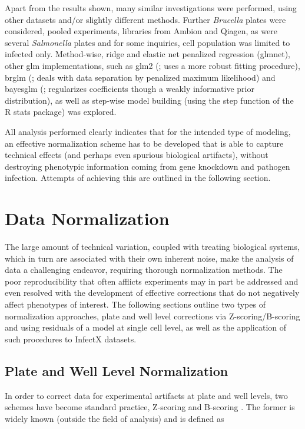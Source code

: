 Apart from the results shown, many similar investigations were performed, using other datasets and\slash or slightly different methods. Further \textit{Brucella} plates were considered, pooled  experiments, libraries from Ambion and Qiagen, as were several \textit{Salmonella} plates and for some inquiries, cell population was limited to infected only. Method-wise, ridge and elastic net penalized regression (glmnet), other glm implementations, such as glm2 (\citet{Marschner2011}; uses a more robust fitting procedure), brglm (\citet{Kosmidis2007}; deals with data separation by penalized maximum likelihood) and bayesglm (\citet{Gelman2007}; regularizes coefficients though a weakly informative prior distribution), as well as step-wise model building (using the step function of the R stats package) was explored.


All analysis performed clearly indicates that for the intended type of modeling, an effective normalization scheme has to be developed that is able to capture technical effects (and perhaps even spurious biological artifacts), without destroying phenotypic information coming from gene knockdown and pathogen infection. Attempts of achieving this are outlined in the following section.

\section{Data Normalization}
\label{sec:data-normalization}
The large amount of technical variation, coupled with treating biological systems, which in turn are associated with their own inherent noise, make the analysis of  data a challenging endeavor, requiring thorough normalization methods. The poor reproducibility that often afflicts  experiments may in part be addressed and even resolved with the development of effective corrections that do not negatively affect phenotypes of interest. The following sections outline two types of normalization approaches, plate and well level corrections via Z-scoring\slash B-scoring and using residuals of a  model at single cell level, as well as the application of such procedures to InfectX datasets.

\subsection{Plate and Well Level Normalization}
In order to correct  data for experimental artifacts at plate and well levels, two schemes have become standard practice, Z-scoring and B-scoring \citep{Malo2006}. The former is widely known (outside the field of  analysis) and is defined as

